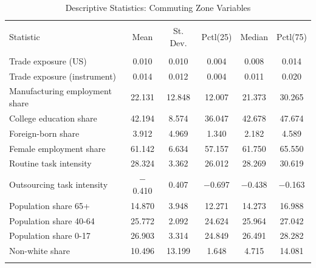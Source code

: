 
\begin{table}[!htbp] \centering 
  \caption{Descriptive Statistics: Commuting Zone Variables} 
  \label{tab:desc_cz} 
\begin{tabular}{@{\extracolsep{5pt}}lccccc} 
\\[-1.8ex]\hline 
\hline \\[-1.8ex] 
Statistic & \multicolumn{1}{c}{Mean} & \multicolumn{1}{c}{St. Dev.} & \multicolumn{1}{c}{Pctl(25)} & \multicolumn{1}{c}{Median} & \multicolumn{1}{c}{Pctl(75)} \\ 
\hline \\[-1.8ex] 
Trade exposure (US) & 0.010 & 0.010 & 0.004 & 0.008 & 0.014 \\ 
Trade exposure (instrument) & 0.014 & 0.012 & 0.004 & 0.011 & 0.020 \\ 
Manufacturing employment share & 22.131 & 12.848 & 12.007 & 21.373 & 30.265 \\ 
College education share & 42.194 & 8.574 & 36.047 & 42.678 & 47.674 \\ 
Foreign-born share & 3.912 & 4.969 & 1.340 & 2.182 & 4.589 \\ 
Female employment share & 61.142 & 6.634 & 57.157 & 61.750 & 65.550 \\ 
Routine task intensity & 28.324 & 3.362 & 26.012 & 28.269 & 30.619 \\ 
Outsourcing task intensity & $-$0.410 & 0.407 & $-$0.697 & $-$0.438 & $-$0.163 \\ 
Population share 65+ & 14.870 & 3.948 & 12.271 & 14.273 & 16.988 \\ 
Population share 40-64 & 25.772 & 2.092 & 24.624 & 25.964 & 27.042 \\ 
Population share 0-17 & 26.903 & 3.314 & 24.849 & 26.491 & 28.282 \\ 
Non-white share & 10.496 & 13.199 & 1.648 & 4.715 & 14.081 \\ 
\hline \\[-1.8ex] 
\end{tabular} 
\end{table} 
